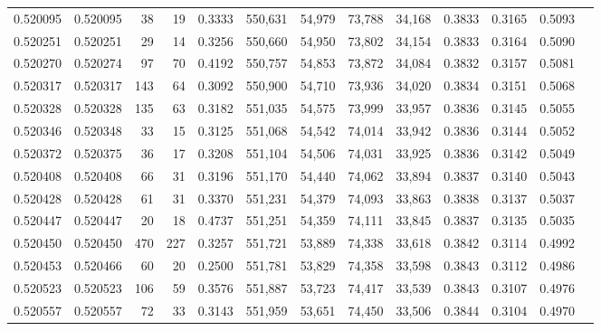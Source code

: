 \begin{tabular}{rrrrrrrrrrrrr}
0.520095 & 0.520095 &    38 &    19 &                                     0.3333 & 550,631 &  54,979 &  73,788 &  34,168 & 0.3833 & 0.3165 & 0.5093 \\
0.520251 & 0.520251 &    29 &    14 &                                     0.3256 & 550,660 &  54,950 &  73,802 &  34,154 & 0.3833 & 0.3164 & 0.5090 \\
0.520270 & 0.520274 &    97 &    70 &                                     0.4192 & 550,757 &  54,853 &  73,872 &  34,084 & 0.3832 & 0.3157 & 0.5081 \\
0.520317 & 0.520317 &   143 &    64 &                                     0.3092 & 550,900 &  54,710 &  73,936 &  34,020 & 0.3834 & 0.3151 & 0.5068 \\
0.520328 & 0.520328 &   135 &    63 &                                     0.3182 & 551,035 &  54,575 &  73,999 &  33,957 & 0.3836 & 0.3145 & 0.5055 \\
0.520346 & 0.520348 &    33 &    15 &                                     0.3125 & 551,068 &  54,542 &  74,014 &  33,942 & 0.3836 & 0.3144 & 0.5052 \\
0.520372 & 0.520375 &    36 &    17 &                                     0.3208 & 551,104 &  54,506 &  74,031 &  33,925 & 0.3836 & 0.3142 & 0.5049 \\
0.520408 & 0.520408 &    66 &    31 &                                     0.3196 & 551,170 &  54,440 &  74,062 &  33,894 & 0.3837 & 0.3140 & 0.5043 \\
0.520428 & 0.520428 &    61 &    31 &                                     0.3370 & 551,231 &  54,379 &  74,093 &  33,863 & 0.3838 & 0.3137 & 0.5037 \\
0.520447 & 0.520447 &    20 &    18 &                                     0.4737 & 551,251 &  54,359 &  74,111 &  33,845 & 0.3837 & 0.3135 & 0.5035 \\
0.520450 & 0.520450 &   470 &   227 &                                     0.3257 & 551,721 &  53,889 &  74,338 &  33,618 & 0.3842 & 0.3114 & 0.4992 \\
0.520453 & 0.520466 &    60 &    20 &                                     0.2500 & 551,781 &  53,829 &  74,358 &  33,598 & 0.3843 & 0.3112 & 0.4986 \\
0.520523 & 0.520523 &   106 &    59 &                                     0.3576 & 551,887 &  53,723 &  74,417 &  33,539 & 0.3843 & 0.3107 & 0.4976 \\
0.520557 & 0.520557 &    72 &    33 &                                     0.3143 & 551,959 &  53,651 &  74,450 &  33,506 & 0.3844 & 0.3104 & 0.4970 \\

\end{tabular}
